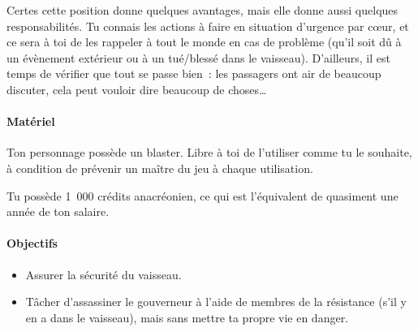 {Certes cette position donne quelques avantages, mais elle donne aussi quelques responsabilités.
Tu connais les actions à faire en situation d’urgence par cœur, et ce sera à toi de les rappeler à tout le monde en cas de problème (qu’il soit dû à un évènement extérieur ou à un tué/blessé dans le vaisseau).
D’ailleurs, il est temps de vérifier que tout se passe bien~:  les passagers ont air de beaucoup discuter, cela peut vouloir dire beaucoup de choses…

\paragraph{Matériel}
{
Ton personnage possède un blaster.
Libre à toi de l’utiliser comme tu le souhaite, à condition de prévenir un maître du jeu à chaque utilisation.

Tu possède 1~000 crédits anacréonien, ce qui est l’équivalent de quasiment une année de ton salaire.
}

\paragraph{Objectifs}{
\begin{itemize}
	\item Assurer la sécurité du vaisseau.
	\item Tâcher d’assassiner le gouverneur à l’aide de membres de la résistance (s’il y en a dans le vaisseau), mais sans mettre ta propre vie en danger.
\end{itemize}
}
}

